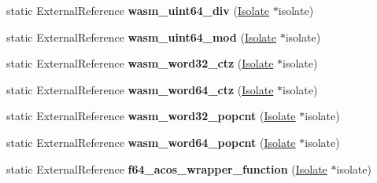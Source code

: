 \begin{DoxyCompactItemize}
\item 
static External\+Reference {\bfseries wasm\+\_\+uint64\+\_\+div} (\hyperlink{classv8_1_1internal_1_1_isolate}{Isolate} $\ast$isolate)\hypertarget{classv8_1_1internal_1_1_b_a_s_e___e_m_b_e_d_d_e_d_ab4a205730db62a82bb8adfe3177f6d70}{}\label{classv8_1_1internal_1_1_b_a_s_e___e_m_b_e_d_d_e_d_ab4a205730db62a82bb8adfe3177f6d70}

\item 
static External\+Reference {\bfseries wasm\+\_\+uint64\+\_\+mod} (\hyperlink{classv8_1_1internal_1_1_isolate}{Isolate} $\ast$isolate)\hypertarget{classv8_1_1internal_1_1_b_a_s_e___e_m_b_e_d_d_e_d_a86b22535f83de8f2758617e7225662fb}{}\label{classv8_1_1internal_1_1_b_a_s_e___e_m_b_e_d_d_e_d_a86b22535f83de8f2758617e7225662fb}

\item 
static External\+Reference {\bfseries wasm\+\_\+word32\+\_\+ctz} (\hyperlink{classv8_1_1internal_1_1_isolate}{Isolate} $\ast$isolate)\hypertarget{classv8_1_1internal_1_1_b_a_s_e___e_m_b_e_d_d_e_d_a94f1131559ed4acb511346201bad10ba}{}\label{classv8_1_1internal_1_1_b_a_s_e___e_m_b_e_d_d_e_d_a94f1131559ed4acb511346201bad10ba}

\item 
static External\+Reference {\bfseries wasm\+\_\+word64\+\_\+ctz} (\hyperlink{classv8_1_1internal_1_1_isolate}{Isolate} $\ast$isolate)\hypertarget{classv8_1_1internal_1_1_b_a_s_e___e_m_b_e_d_d_e_d_a4d160fbe2f7e9d0eb0be7c19f2a987fd}{}\label{classv8_1_1internal_1_1_b_a_s_e___e_m_b_e_d_d_e_d_a4d160fbe2f7e9d0eb0be7c19f2a987fd}

\item 
static External\+Reference {\bfseries wasm\+\_\+word32\+\_\+popcnt} (\hyperlink{classv8_1_1internal_1_1_isolate}{Isolate} $\ast$isolate)\hypertarget{classv8_1_1internal_1_1_b_a_s_e___e_m_b_e_d_d_e_d_ac2e31658c7a8522a8329921ce4bd0a15}{}\label{classv8_1_1internal_1_1_b_a_s_e___e_m_b_e_d_d_e_d_ac2e31658c7a8522a8329921ce4bd0a15}

\item 
static External\+Reference {\bfseries wasm\+\_\+word64\+\_\+popcnt} (\hyperlink{classv8_1_1internal_1_1_isolate}{Isolate} $\ast$isolate)\hypertarget{classv8_1_1internal_1_1_b_a_s_e___e_m_b_e_d_d_e_d_acd7ffff19a7ff2dbc70a7a438ef99c35}{}\label{classv8_1_1internal_1_1_b_a_s_e___e_m_b_e_d_d_e_d_acd7ffff19a7ff2dbc70a7a438ef99c35}

\item 
static External\+Reference {\bfseries f64\+\_\+acos\+\_\+wrapper\+\_\+function} (\hyperlink{classv8_1_1internal_1_1_isolate}{Isolate} $\ast$isolate)\hypertarget{classv8_1_1internal_1_1_b_a_s_e___e_m_b_e_d_d_e_d_a8986d4f747ed7d950b6b14707e906070}{}\label{classv8_1_1internal_1_1_b_a_s_e___e_m_b_e_d_d_e_d_a8986d4f747ed7d950b6b14707e906070}


\end{DoxyCompactItemize}
